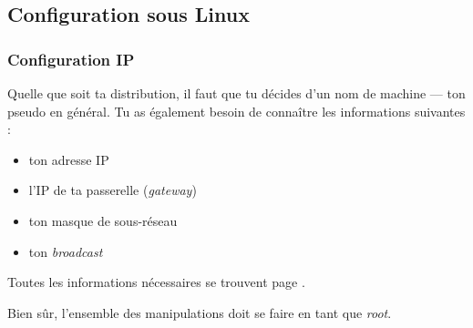 


\subsection{Configuration sous Linux}

\subsubsection{Configuration IP}
Quelle que soit ta distribution, il faut que tu décides d'un nom de
machine --- ton pseudo en général. Tu as également besoin de
conna\^itre les informations suivantes :
\begin{itemize}
  \item ton adresse IP %
  \item l'IP de ta passerelle (\emph{gateway})
  \item ton masque de sous-réseau
  \item ton \emph{broadcast}
\end{itemize}
Toutes les informations nécessaires se trouvent page
\pageref{calcul_ip}.

Bien sûr, l'ensemble des manipulations doit se faire en tant que \emph{root}.


\paragraph{}

